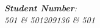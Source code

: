 \begin{titlepage}
\begin{center}
		\textit{\textbf{Student Number}: \\ 501 \& 501209136 \& 501}
            
        \vspace{2cm}
            
        \Large
         
		\vspace{0.25cm}                  
            
        \vspace{0.25cm}
           
            
    \end{center}
\end{titlepage}




